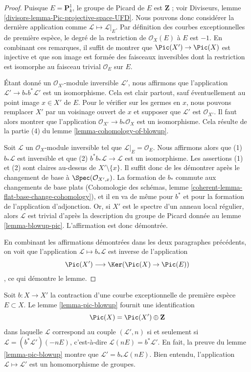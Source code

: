 \begin{proof} Puisque $E = \mathbf{P}^1_k$, le groupe de Picard de $E$ est $\mathbf{Z}$ ; voir Diviseurs, lemme \ref{divisors-lemma-Pic-projective-space-UFD}. Nous pouvons donc considérer la dernière application comme $\mathcal{L} \mapsto \mathcal{L}|_E$. Par définition des courbes exceptionnelles de première espèce, le degré de la restriction de $\mathcal{O}_X(E)$ à $E$ est $-1$. En combinant ces remarques, il suffit de montrer que $\Pic(X') \to \Pic(X)$ est injective et que son image est formée des faisceaux inversibles dont la restriction est isomorphe au faisceau trivial $\mathcal{O}_E$ sur $E$.

\medskip\noindent Étant donné un $\mathcal{O}_{X'}$-module inversible $\mathcal{L}'$, nous affirmons que l'application $\mathcal{L}' \to b_*b^*\mathcal{L}'$ est un isomorphisme. Cela est clair partout, sauf éventuellement au point image $x \in X'$ de $E$. Pour le vérifier sur les germes en $x$, nous pouvons remplacer $X'$ par un voisinage ouvert de $x$ et supposer que $\mathcal{L}'$ est $\mathcal{O}_{X'}$. Il faut alors montrer que l'application $\mathcal{O}_{X'} \to b_*\mathcal{O}_X$ est un isomorphisme. Cela résulte de la partie (4) du lemme \ref{lemma-cohomology-of-blowup}.

\medskip\noindent Soit $\mathcal{L}$ un $\mathcal{O}_X$-module inversible tel que $\mathcal{L}|_E = \mathcal{O}_E$. Nous affirmons alors que (1) $b_*\mathcal{L}$ est inversible et que (2) $b^*b_*\mathcal{L} \to \mathcal{L}$ est un isomorphisme. Les assertions (1) et (2) sont claires au-dessus de $X' \setminus \{x\}$. Il suffit donc de les démontrer après le changement de base à $\Spec(\mathcal{O}_{X', x})$. La formation de $b_*$ commute aux changements de base plats (Cohomologie des schémas, lemme \ref{coherent-lemma-flat-base-change-cohomology}), et il en va de même pour $b^*$ et pour la formation de l'application d'adjonction. Or, si $X'$ est le spectre d'un anneau local régulier, alors $\mathcal{L}$ est trivial d'après la description du groupe de Picard donnée au lemme \ref{lemma-blowup-pic}. L'affirmation est donc démontrée.

\medskip\noindent En combinant les affirmations démontrées dans les deux paragraphes précédents, on voit que l'application $\mathcal{L} \mapsto b_*\mathcal{L}$ est inverse de l'application $$
\Pic(X') \longrightarrow \Ker(\Pic(X) \to \Pic(E))
$$, ce qui démontre le lemme. \end{proof}

\begin{remark} \label{remark-pic-blowup} Soit $b : X \to X'$ la contraction d'une courbe exceptionnelle de première espèce $E \subset X$. Le lemme \ref{lemma-pic-blowup} fournit une identification $$
\Pic(X) = \Pic(X') \oplus \mathbf{Z}
$$ dans laquelle $\mathcal{L}$ correspond au couple $(\mathcal{L}', n)$ si et seulement si $\mathcal{L} = (b^*\mathcal{L}')(-nE)$, c'est-à-dire $\mathcal{L}(nE) = b^*\mathcal{L}'$. En fait, la preuve du lemme \ref{lemma-pic-blowup} montre que $\mathcal{L}' = b_*\mathcal{L}(nE)$. Bien entendu, l'application $\mathcal{L} \mapsto \mathcal{L}'$ est un homomorphisme de groupes. \end{remark}

